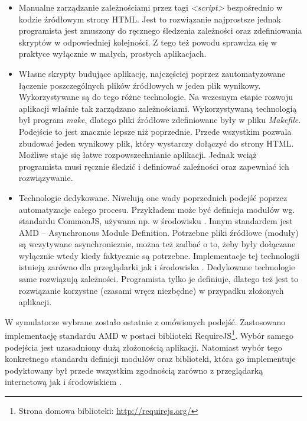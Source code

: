 \begin{itemize}

\item Manualne zarządzanie zależnościami przez tagi \emph{<script>} bezpośrednio
w kodzie źródłowym strony HTML. Jest to rozwiązanie najprostsze jednak
programista jest zmuszony do ręcznego śledzenia zależności oraz zdefiniowania
skryptów w odpowiedniej kolejności. Z tego też powodu sprawdza się w praktyce
wyłącznie w małych, prostych aplikacjach.

\item Własne skrypty budujące aplikację, najczęściej poprzez zautomatyzowane
łączenie poszczególnych plików źródłowych w jeden plik wynikowy. Wykorzystywane
są do tego różne technologie. Na wczesnym etapie rozwoju aplikacji \en właśnie
tak zarządzano zależnościami. Wykorzystywaną technologią był program
\emph{make}, dlatego pliki źródłowe zdefiniowane były w pliku \emph{Makefile}.
Podejście to jest znacznie lepsze niż poprzednie. Przede wszystkim pozwala
zbudować jeden wynikowy plik, który wystarczy dołączyć do strony HTML. Możliwe
staje się łatwe rozpowszechnianie aplikacji. Jednak wciąż programista musi
ręcznie śledzić i definiować zależności oraz zapewniać ich rozwiązywanie.

\item Technologie dedykowane. Niwelują one wady poprzednich podejść poprzez
automatyzacje całego procesu. Przykładem może być definicja modułów wg.
standardu CommonJS, używana np. w środowisku . Innym standardem jest
AMD -- Asynchronous Module Definition. Potrzebne pliki źródłowe (moduły) są
wczytywane asynchronicznie, można też zadbać o to, żeby były dołączane wyłącznie
wtedy kiedy faktycznie są potrzebne. Implementacje tej technologii istnieją
zarówno dla przeglądarki jak i środowiska . Dedykowane technologie
same rozwiązują zależności. Programista tylko je definiuje, dlatego też jest to
rozwiązanie korzystne (czasami wręcz niezbędne) w przypadku złożonych aplikacji.

\end{itemize}

W symulatorze \en wybrane zostało ostatnie z omówionych podejść. Zastosowano
implementację standardu AMD w postaci biblioteki RequireJS\footnote {Strona
domowa biblioteki: \url{http://requirejs.org/}}. Wybór samego podejścia jest
uzasadniony dużą złożonością aplikacji. Natomiast wybór tego konkretnego
standardu definicji modułów oraz biblioteki, która go implementuje podyktowany
był przede wszystkim zgodnością zarówno z przeglądarką internetową jak i
środowiskiem .

